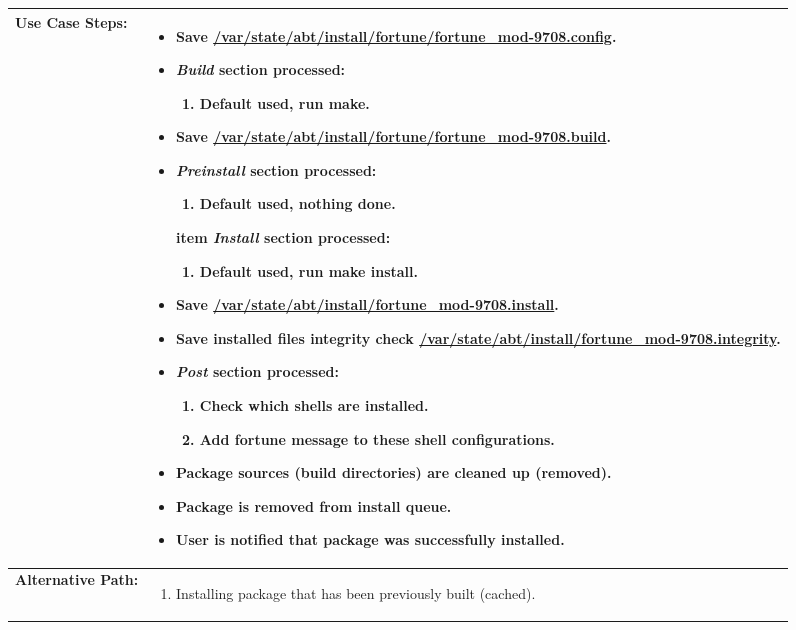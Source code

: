 \begin{tabularx}{\linewidth}{|l|X|}
\hline
\textbf{Use Case Steps:} & 
\begin{minipage}{\linewidth}
  \vspace{0.05em}
  \begin{itemize}
    \item Save \url{/var/state/abt/install/fortune/fortune_mod-9708.config}.
    \item \emph{Build} section processed:
    \begin{enumerate}
      \item Default used, run \textbf{make}.
    \end{enumerate}
    \item Save \url{/var/state/abt/install/fortune/fortune_mod-9708.build}.
    \item \emph{Preinstall} section processed:
    \begin{enumerate}
      \item Default used, nothing done.
    \end{enumerate}
    item \emph{Install} section processed:
    \begin{enumerate}
      \item Default used, run \textbf{make install}.
    \end{enumerate}
    \item Save \url{/var/state/abt/install/fortune_mod-9708.install}.
    \item Save installed files integrity check \url{/var/state/abt/install/fortune_mod-9708.integrity}.
    \item \emph{Post} section processed:
    \begin{enumerate}
      \item Check which shells are installed.
      \item Add fortune message to these shell configurations.
    \end{enumerate}
    \item Package sources (build directories) are cleaned up (removed).
    \item Package is removed from install queue.
    \item User is notified that package was successfully installed.
  \end{itemize}
  \vspace{0.05em}
\end{minipage}
\\
\hline 
\textbf{Alternative Path:} &
\begin{minipage}{\linewidth}
  \vspace{0.05em} 
  \begin{enumerate}
    \item Installing package that has been previously built (cached).
  \end{enumerate}
  \vspace{0.05em} 
\end{minipage}
\\
\hline
\end{tabularx}

\newpage


